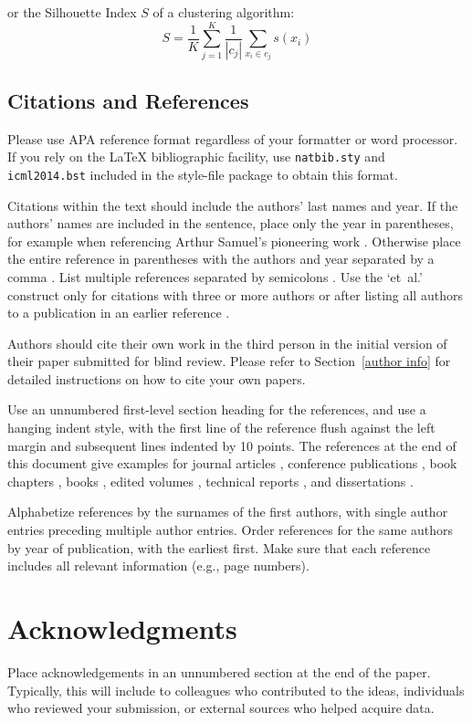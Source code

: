 \documentclass{article}
\begin{document}
or the Silhouette Index $S$ of a clustering algorithm:
\begin{equation}
S = \frac{1}{K} \sum_{j=1}^{K}\frac{1}{|c_j|}\sum_{x_i \in c_j}s(x_i)
\end{equation}\label{eqn:silhouette}

\subsection{Citations and References}

Please use APA reference format regardless of your formatter
or word processor. If you rely on the \LaTeX\/ bibliographic
facility, use {\tt natbib.sty} and {\tt icml2014.bst}
included in the style-file package to obtain this format.

Citations within the text should include the authors' last names and
year. If the authors' names are included in the sentence, place only
the year in parentheses, for example when referencing Arthur Samuel's
pioneering work . Otherwise place the entire
reference in parentheses with the authors and year separated by a
comma \cite{Samuel59}. List multiple references separated by
semicolons \cite{kearns89,Samuel59,mitchell80}. Use the `et~al.'
construct only for citations with three or more authors or after
listing all authors to a publication in an earlier reference \cite{MachineLearningI}.

Authors should cite their own work in the third person
in the initial version of their paper submitted for blind review.
Please refer to Section~\ref{author info} for detailed instructions on how to
cite your own papers.

Use an unnumbered first-level section heading for the references, and
use a hanging indent style, with the first line of the reference flush
against the left margin and subsequent lines indented by 10 points.
The references at the end of this document give examples for journal
articles \cite{Samuel59}, conference publications \cite{langley00}, book chapters \cite{Newell81}, books \cite{DudaHart2nd}, edited volumes \cite{MachineLearningI},
technical reports \cite{mitchell80}, and dissertations \cite{kearns89}.

Alphabetize references by the surnames of the first authors, with
single author entries preceding multiple author entries. Order
references for the same authors by year of publication, with the
earliest first. Make sure that each reference includes all relevant
information (e.g., page numbers).


\section*{Acknowledgments}


Place acknowledgements in an unnumbered section at the
end of the paper. Typically, this will include
to colleagues who contributed to the ideas, individuals who
reviewed your submission, or external sources who helped
acquire data.


\nocite{langley00}



\end{document}
